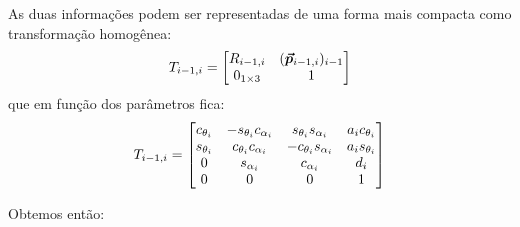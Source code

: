As duas informações podem ser representadas de uma forma mais compacta como transformação homogênea:
\begin{equation}
T_{i-1,i} = \begin{bmatrix}
	R_{i-1,i} 		&  (\bm{\vec{p}}_{i-1,i})_{i-1} \\
	0_{1 \times 3}	&  							  1
\end{bmatrix}
\end{equation}
que em função dos parâmetros fica:
\begin{equation}
T_{i-1,i} = \begin{bmatrix}
	c_{\theta_i}  & -s_{\theta_i}c_{\alpha_i}	&	s_{\theta_i}s_{\alpha_i}  &	a_i c_{\theta_i} \\ 
	s_{\theta_i}  &	c_{\theta_i}c_{\alpha_i}	&  -c_{\theta_i}s_{\alpha_i}  & a_i s_{\theta_i} \\
	0			  & s_{\alpha_i}				&   c_{\alpha_i}			  &	d_i				 \\
	0			  & 0							&   0						  & 1
\end{bmatrix}
\end{equation}

Obtemos então:



